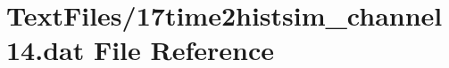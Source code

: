 \hypertarget{17time2histsim__channel14_8dat}{}\section{Text\+Files/17time2histsim\+\_\+channel14.dat File Reference}
\label{17time2histsim__channel14_8dat}
